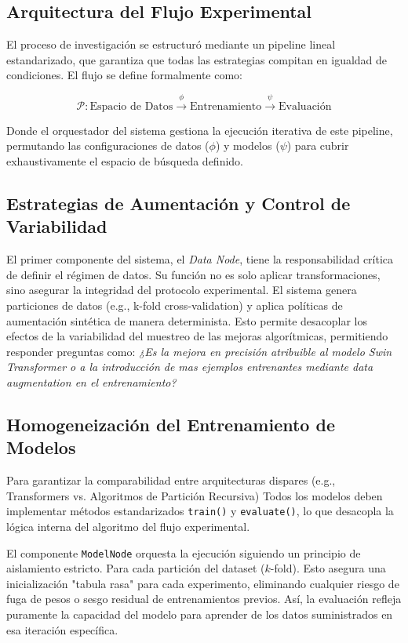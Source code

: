 \documentclass[onecolumn, 12pt , journal]{IEEEtran}
\begin{document}
\subsection{Arquitectura del Flujo Experimental}
El proceso de investigación se estructuró mediante un pipeline lineal estandarizado, que garantiza que todas las estrategias compitan en igualdad de condiciones. El flujo se define formalmente como:

\begin{equation}
    \mathcal{P} : \text{Espacio de Datos} \xrightarrow{\phi} \text{Entrenamiento} \xrightarrow{\psi} \text{Evaluación}
\end{equation}

Donde el orquestador del sistema gestiona la ejecución iterativa de este pipeline, permutando las configuraciones de datos ($\phi$) y modelos ($\psi$) para cubrir exhaustivamente el espacio de búsqueda definido.

\subsection{Estrategias de Aumentación y Control de Variabilidad}
El primer componente del sistema, el \textit{Data Node}, tiene la responsabilidad crítica de definir el régimen de datos. Su función no es solo aplicar transformaciones, sino asegurar la integridad del protocolo experimental.
El sistema genera particiones de datos (e.g., k-fold cross-validation) y aplica políticas de aumentación sintética de manera determinista. Esto permite desacoplar los efectos de la variabilidad del muestreo de las mejoras algorítmicas, permitiendo responder preguntas como: \textit{¿Es la mejora en precisión atribuible al modelo Swin Transformer o a la introducción de mas ejemplos entrenantes mediante data augmentation en el entrenamiento?}

\subsection{Homogeneización del Entrenamiento de Modelos}
Para garantizar la comparabilidad entre arquitecturas dispares (e.g., Transformers vs. Algoritmos de Partición Recursiva) Todos los modelos deben implementar métodos estandarizados \texttt{train()} y \texttt{evaluate()}, lo que desacopla la lógica interna del algoritmo del flujo experimental.

El componente \texttt{ModelNode} orquesta la ejecución siguiendo un principio de aislamiento estricto. Para cada partición del dataset ($k$-fold). Esto asegura una inicialización "tabula rasa" para cada experimento, eliminando cualquier riesgo de fuga de pesos o sesgo residual de entrenamientos previos. Así, la evaluación refleja puramente la capacidad del modelo para aprender de los datos suministrados en esa iteración específica.
\end{document}
